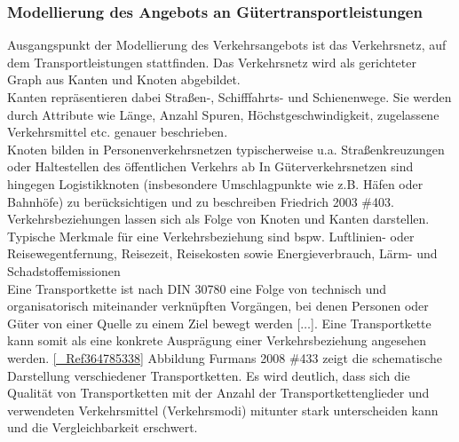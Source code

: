 \subsubsection{Modellierung des Angebots an Gütertransportleistungen}
\label{_Ref364779574}
\label{_Ref364789145}
\label{_Toc366766084}
\label{_Toc366775278}
Ausgangspunkt der Modellierung des Verkehrsangebots ist das Verkehrsnetz, auf dem Transportleistungen stattfinden. Das Verkehrsnetz wird als gerichteter Graph aus Kanten und Knoten abgebildet.~\\
Kanten repräsentieren dabei Straßen-, Schifffahrts- und Schienenwege. Sie werden durch Attribute wie Länge, Anzahl Spuren, Höchstgeschwindigkeit, zugelassene Verkehrsmittel etc. genauer beschrieben.~\\
Knoten bilden in Personenverkehrsnetzen typischerweise u.a. Straßenkreuzungen oder Haltestellen des öffentlichen Verkehrs ab  \autocites[][]{bib.771} \autocites[][]{bib.268} \autocites[][]{bib.251} In Güterverkehrsnetzen sind hingegen Logistikknoten (insbesondere Umschlagpunkte wie z.B. Häfen oder Bahnhöfe) zu berücksichtigen und zu beschreiben {Friedrich 2003 \#403}.~\\
Verkehrsbeziehungen lassen sich als Folge von Knoten und Kanten darstellen. Typische Merkmale für eine Verkehrsbeziehung sind bspw. Luftlinien- oder Reisewegentfernung, Reisezeit, Reisekosten  \autocites[][]{bib.213} sowie Energieverbrauch, Lärm- und Schadstoffemissionen  \autocites[][]{bib.885}~\\
Eine Transportkette ist \glqq nach DIN 30780 eine Folge von technisch und organisatorisch miteinander verknüpften Vorgängen, bei denen Personen oder Güter von einer Quelle zu einem Ziel bewegt werden [$\ldots$]. Eine Transportkette kann somit als eine konkrete Ausprägung einer Verkehrsbeziehung angesehen werden. \autoref{_Ref364785338} Abbildung  {Furmans 2008 \#433} zeigt die schematische Darstellung verschiedener Transportketten. Es wird deutlich, dass sich die Qualität von Transportketten mit der Anzahl der Transportkettenglieder und verwendeten Verkehrsmittel (Verkehrsmodi) mitunter stark unterscheiden kann und die Vergleichbarkeit erschwert.~\\

